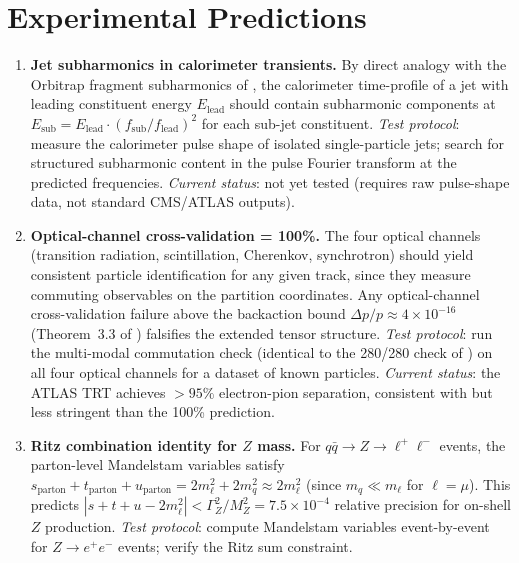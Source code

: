 \documentclass[twocolumn,10pt,a4paper]{article}
\theoremstyle{thmstyle}
\theoremstyle{definition}
\theoremstyle{remark}
\begin{document}
\section{Experimental Predictions}
\label{sec:predictions}

\begin{enumerate}[nosep,label=\textbf{P\arabic*.}]

\item \textbf{Jet subharmonics in calorimeter transients.}
By direct analogy with the Orbitrap fragment subharmonics of
\citet{companion:tensor}, the calorimeter time-profile of a jet with
leading constituent energy $E_\text{lead}$ should contain subharmonic
components at $E_\text{sub} = E_\text{lead}\cdot(f_\text{sub}/f_\text{lead})^2$
for each sub-jet constituent.
\emph{Test protocol}: measure the calorimeter pulse shape of isolated
single-particle jets; search for structured subharmonic content in the
pulse Fourier transform at the predicted frequencies.
\emph{Current status}: not yet tested (requires raw pulse-shape data,
not standard CMS/ATLAS outputs).

\item \textbf{Optical-channel cross-validation = 100\%.}
The four optical channels (transition radiation, scintillation, Cherenkov,
synchrotron) should yield consistent particle identification for any given
track, since they measure commuting observables on the partition coordinates.
Any optical-channel cross-validation failure above the backaction bound
$\Delta p/p \approx 4\times10^{-16}$ (Theorem~3.3 of \citealt{companion:qnd})
falsifies the extended tensor structure.
\emph{Test protocol}: run the multi-modal commutation check (identical to
the 280/280 check of \citealt{companion:hyperfine}) on all four optical
channels for a dataset of known particles.
\emph{Current status}: the ATLAS TRT achieves $>95\%$ electron-pion
separation, consistent with but less stringent than the 100\% prediction.

\item \textbf{Ritz combination identity for $Z$ mass.}
For $q\bar q \to Z \to \ell^+\ell^-$ events, the parton-level Mandelstam
variables satisfy $s_\text{parton} + t_\text{parton} + u_\text{parton}
= 2m_\ell^2 + 2m_q^2 \approx 2m_\ell^2$ (since $m_q \ll m_\ell$ for
$\ell = \mu$).  This predicts $|s + t + u - 2m_\ell^2| < \Gamma_Z^2/M_Z^2
= 7.5\times10^{-4}$ relative precision for on-shell $Z$ production.
\emph{Test protocol}: compute Mandelstam variables event-by-event for
$Z \to e^+e^-$ events; verify the Ritz sum constraint.


\end{enumerate}
\end{document}
